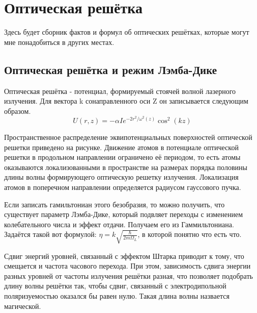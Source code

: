 \chapter{Оптическая решётка}\label{app:A}

%

Здесь будет сборник фактов и формул об оптических решётках, которые могут мне понадобиться в других местах.

\section{Оптическая решётка и режим Лэмба-Дике}

Оптическая решётка - потенциал, формируемый стоячей волной лазерного излучения.
Для вектора k сонаправленного оси Z он записывается следующим образом.
\begin{equation}
	\label{eq:LatticePotential1_app} 
	U(r, z) = -\alpha I e^{-2r^2/\omega^2(z)} \cos^2(kz)
\end{equation}

Пространственное распределение эквипотенциальных поверхностей оптической решетки приведено на рисунке. 
Движение атомов в потенциале оптической решетки в продольном направлении ограничено её периодом, то есть атомы оказываются локализованными в пространстве на размерах порядка половины длины волны формирующего оптическую решетку излучения. 
Локализация атомов в поперечном направлении определяется радиусом гауссового пучка.

Если записать гамильтониан этого безобразия, то можно получить, что существует параметр Лэмба-Дике, который подвляет переходы с изменением колебательного числа и эффект отдачи.
Получаем его из Гаммильтониана.
Задаётся такой вот формулой: $\eta = k\sqrt{\frac{\hbar}{2m\Omega_L}}$, в которой понятно что есть что.

Сдвиг энергий уровней, связанный с эффектом Штарка приводит к тому, что смещается и частота часового перехода.
При этом, зависимость сдвига энергии разных уровней от частоты излучения решётки разная, что позволяет подобрать длину волны решётки так, чтобы сдвиг, связанный с электродипольной поляризуемостью оказался бы равен нулю. 
Такая длина волны назвается магической.

